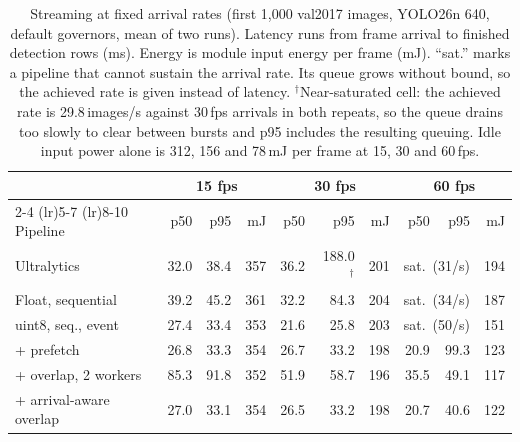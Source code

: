 \begin{table}[t]
\centering
\caption{Streaming at fixed arrival rates (first 1,000 val2017 images, YOLO26n 640,
default governors, mean of two runs). Latency runs from frame arrival to finished
detection rows (ms). Energy is module input energy per frame (mJ). ``sat.'' marks a pipeline
that cannot sustain the arrival rate. Its queue grows without bound, so the
achieved rate is given instead of latency. $^\dagger$Near-saturated
cell: the achieved rate is 29.8\,images/s against 30\,fps arrivals in
both repeats, so the queue drains too slowly to clear between bursts
and p95 includes the resulting queuing. Idle input power alone is
312, 156 and 78\,mJ per frame at 15, 30 and 60\,fps.}
\label{tab:stream}
\small
\begin{tabular}{l rrr rrr rrr}
\toprule
& \multicolumn{3}{c}{15 fps} & \multicolumn{3}{c}{30 fps} & \multicolumn{3}{c}{60 fps} \\
\cmidrule(lr){2-4} \cmidrule(lr){5-7} \cmidrule(lr){8-10}
Pipeline & p50 & p95 & mJ & p50 & p95 & mJ & p50 & p95 & mJ \\
\midrule
Ultralytics & 32.0 & 38.4 & 357 & 36.2 & 188.0$^\dagger$ & 201 & \multicolumn{2}{c}{sat.\ (31/s)} & 194 \\
Float, sequential & 39.2 & 45.2 & 361 & 32.2 & 84.3 & 204 & \multicolumn{2}{c}{sat.\ (34/s)} & 187 \\
uint8, seq., event & 27.4 & 33.4 & 353 & 21.6 & 25.8 & 203 & \multicolumn{2}{c}{sat.\ (50/s)} & 151 \\
+ prefetch & 26.8 & 33.3 & 354 & 26.7 & 33.2 & 198 & 20.9 & 99.3 & 123 \\
+ overlap, 2 workers & 85.3 & 91.8 & 352 & 51.9 & 58.7 & 196 & 35.5 & 49.1 & 117 \\
+ arrival-aware overlap & 27.0 & 33.1 & 354 & 26.5 & 33.2 & 198 & 20.7 & 40.6 & 122 \\
\bottomrule
\end{tabular}
\end{table}
